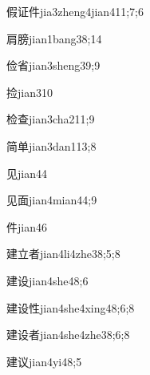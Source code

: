 \begin{verbete}{假证件}{jia3zheng4jian4}{11;7;6}
\end{verbete}
\begin{verbete}{肩膀}{jian1bang3}{8;14}
\end{verbete}
\begin{verbete}{俭省}{jian3sheng3}{9;9}
\end{verbete}
\begin{verbete}{捡}{jian3}{10}
\end{verbete}
\begin{verbete}{检查}{jian3cha2}{11;9}
\end{verbete}
\begin{verbete}{简单}{jian3dan1}{13;8}
\end{verbete}
\begin{verbete}{见}{jian4}{4}
\end{verbete}
\begin{verbete}{见面}{jian4mian4}{4;9}
\end{verbete}
\begin{verbete}{件}{jian4}{6}
\end{verbete}
\begin{verbete}{建立者}{jian4li4zhe3}{8;5;8}
\end{verbete}
\begin{verbete}{建设}{jian4she4}{8;6}
\end{verbete}
\begin{verbete}{建设性}{jian4she4xing4}{8;6;8}
\end{verbete}
\begin{verbete}{建设者}{jian4she4zhe3}{8;6;8}
\end{verbete}
\begin{verbete}{建议}{jian4yi4}{8;5}
\end{verbete}
